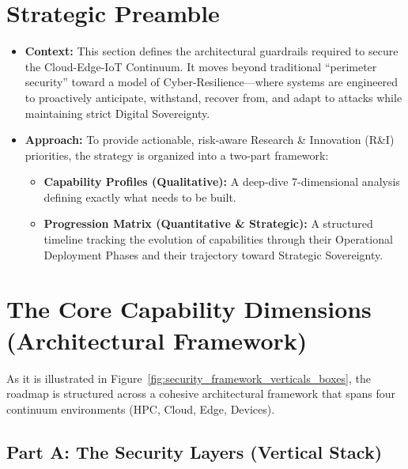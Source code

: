 \documentclass[12pt,a4paper]{report}
\begin{document}
\section{Strategic Preamble}
\begin{itemize}
    \item \textbf{Context:} This section defines the architectural guardrails required to secure the Cloud-Edge-IoT Continuum. It moves beyond traditional ``perimeter security'' toward a model of Cyber-Resilience---where systems are engineered to proactively anticipate, withstand, recover from, and adapt to attacks while maintaining strict Digital Sovereignty.
    \item \textbf{Approach:} To provide actionable, risk-aware Research \& Innovation (R\&I) priorities, the strategy is organized into a two-part framework:
    \begin{itemize}
        \item \textbf{Capability Profiles (Qualitative):} A deep-dive 7-dimensional analysis defining exactly what needs to be built.
        \item \textbf{Progression Matrix (Quantitative \& Strategic):} A structured timeline tracking the evolution of capabilities through their Operational Deployment Phases and their trajectory toward Strategic Sovereignty.
    \end{itemize}
\end{itemize}

\section{The Core Capability Dimensions (Architectural Framework)}
As it is illustrated in Figure~\ref{fig:security_framework_verticals_boxes}, the roadmap is structured across a cohesive architectural framework that spans four continuum environments (HPC, Cloud, Edge, Devices).

\subsection*{Part A: The Security Layers (Vertical Stack)}
\end{document}
